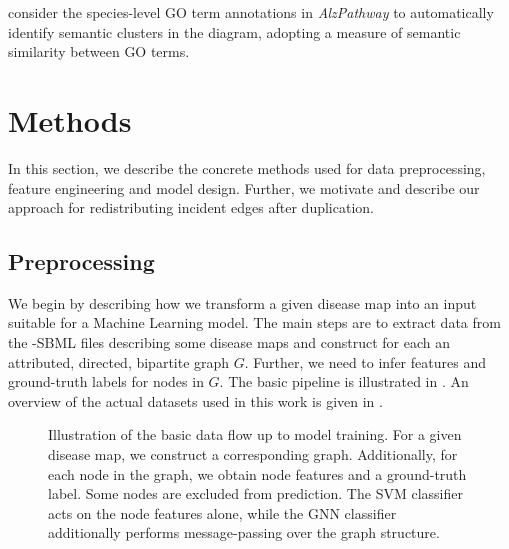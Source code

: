\documentclass[
	fontsize=10pt, %
	twoside=false, %
	secnumdepth=1, %
  toc=indentunnumbered %
]{kaobook}
\begin{document}
\citeauthor{ostaszewski_ClusteringApproachesVisual_2018} consider the
species-level GO term annotations in \textit{AlzPathway} to automatically
identify semantic clusters in the diagram, adopting a measure of semantic
similarity between GO terms.











\chapter{Methods}
\label{sec:methods}

In this section, we describe the concrete methods used for data
preprocessing, feature engineering and model design. Further, we motivate and
describe our approach for redistributing incident edges after duplication.

\section{Preprocessing}
\label{sec:datasets}

We begin by describing how we transform a given disease map into an input
suitable for a Machine Learning model.
%
The main steps are to extract data from the -SBML files
describing some disease maps and construct for each an attributed, directed,
bipartite graph $G$. Further, we need to infer features and ground-truth labels for nodes in
$G$. The basic pipeline is illustrated in . An overview of
the actual datasets used in this work is given in .


\begin{figure}[h]
  \centering
  \caption{Illustration of the basic data flow up to model training. For a given
    disease map, we construct a corresponding graph. Additionally, for each node
    in the graph, we obtain node features and a ground-truth label. Some nodes are
    excluded from prediction. The SVM classifier acts on the node features alone,
    while the GNN classifier additionally performs message-passing over the graph structure.}
  \label{fig:diag-pipeline}
\end{figure}
\end{document}
